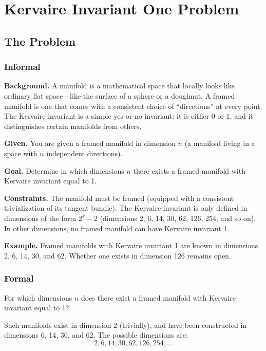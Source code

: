 \let\LocalMacro\relax

\chapter{Kervaire Invariant One Problem}

\section{The Problem}

\subsection{Informal}

\textbf{Background.} A manifold is a mathematical space that locally looks like ordinary flat space---like the surface of a sphere or a doughnut. A framed manifold is one that comes with a consistent choice of ``directions'' at every point. The Kervaire invariant is a simple yes-or-no invariant: it is either 0 or 1, and it distinguishes certain manifolds from others.

\textbf{Given.} You are given a framed manifold in dimension $n$ (a manifold living in a space with $n$ independent directions).

\textbf{Goal.} Determine in which dimensions $n$ there exists a framed manifold with Kervaire invariant equal to 1.

\textbf{Constraints.} The manifold must be framed (equipped with a consistent trivialization of its tangent bundle). The Kervaire invariant is only defined in dimensions of the form $2^k - 2$ (dimensions 2, 6, 14, 30, 62, 126, 254, and so on). In other dimensions, no framed manifold can have Kervaire invariant 1.

\textbf{Example.} Framed manifolds with Kervaire invariant 1 are known in dimensions 2, 6, 14, 30, and 62. Whether one exists in dimension 126 remains open.

\subsection{Formal}
For which dimensions $n$ does there exist a framed manifold with Kervaire invariant equal to 1?

Such manifolds exist in dimension 2 (trivially), and have been constructed in dimensions 6, 14, 30, and 62. The possible dimensions are:
\[2, 6, 14, 30, 62, 126, 254, \ldots\]

